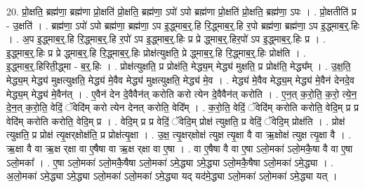 \documentclass[17pt]{extarticle}
\begin{document}
20. प्रो॒क्षति॒ ब्रह्म॑णा॒ ब्रह्म॑णा प्रो॒क्षति॑ प्रो॒क्षति॒ ब्रह्म॑णा॒ ऽपो॑ ऽपो ब्रह्म॑णा प्रो॒क्षति॑ प्रो॒क्षति॒ ब्रह्म॑णा॒ ऽपः । . प्रो॒क्षतीति॑ प्र - उ॒क्षति॑ । . ब्रह्म॑णा॒ ऽपो॑ ऽपो ब्रह्म॑णा॒ ब्रह्म॑णा॒ ऽप इ॒द्ध्माब॒र्॒.हि रि॒द्ध्माब॒र्॒.हि र॒पो ब्रह्म॑णा॒ ब्रह्म॑णा॒ ऽप इ॒द्ध्माब॒र्॒.हिः । . अ॒प इ॒द्ध्माब॒र्॒.हि रि॒द्ध्माब॒र्॒.हि र॒पो॑ ऽप इ॒द्ध्माब॒र्॒.हिः प्र प्रे द्ध्माब॒र्॒.हिर॒पो॑ ऽप इ॒द्ध्माब॒र्॒.हिः प्र । . इ॒द्ध्माब॒र्॒.हिः प्र प्रे द्ध्माब॒र्॒.हि रि॒द्ध्माब॒र्॒.हिः प्रोक्ष॑त्युक्षति॒ प्रे द्ध्माब॒र्॒.हि रि॒द्ध्माब॒र्॒.हिः प्रोक्ष॑ति । . इ॒द्ध्माब॒र्॒.हिरिती॒द्ध्मा - ब॒र्॒.हिः । . प्रोक्ष॑त्युक्षति॒ प्र प्रोक्ष॑ति॒ मेद्ध्य॒म् मेद्ध्य॑ मुक्षति॒ प्र प्रोक्ष॑ति॒ मेद्ध्य᳚म् । . उ॒क्ष॒ति॒ मेद्ध्य॒म् मेद्ध्य॑ मुक्षत्युक्षति॒ मेद्ध्य॑ मे॒वैव मेद्ध्य॑ मुक्षत्युक्षति॒ मेद्ध्य॑ मे॒व । . मेद्ध्य॑ मे॒वैव मेद्ध्य॒म् मेद्ध्य॑ मे॒वैन॑ देनदे॒व मेद्ध्य॒म् मेद्ध्य॑ मे॒वैन॑त् । . ए॒वैन॑ देन दे॒वैवैन॑त् करोति करो त्येन दे॒वैवैन॑त् करोति । . ए॒न॒त् क॒रो॒ति॒ क॒रो॒ त्ये॒न॒ दे॒न॒त् क॒रो॒ति॒ वेदिं॒ ॅवेदि॑म् करो त्येन देनत् करोति॒ वेदि᳚म् । . क॒रो॒ति॒ वेदिं॒ ॅवेदि॑म् करोति करोति॒ वेदि॒म् प्र प्र वेदि॑म् करोति करोति॒ वेदि॒म् प्र । . वेदि॒म् प्र प्र वेदिं॒ ॅवेदि॒म् प्रोक्ष॑ त्युक्षति॒ प्र वेदिं॒ ॅवेदि॒म् प्रोक्ष॑ति । . प्रोक्ष॑ त्युक्षति॒ प्र प्रोक्ष॑ त्यृ॒क्षर्‌क्षोक्ष॑ति॒ प्र प्रोक्ष॑त्यृ॒क्षा । . उ॒क्ष॒ त्यृ॒क्षर्‌क्षोक्ष॑ त्युक्ष त्यृ॒क्षा वै वा ऋ॒क्षोक्ष॑ त्युक्ष त्यृ॒क्षा वै । . ऋ॒क्षा वै वा ऋ॒क्ष र्‌क्षा वा ए॒षैषा वा ऋ॒क्ष र्‌क्षा वा ए॒षा । . वा ए॒षैषा वै वा ए॒षा ऽलो॒मका॑ ऽलो॒मकै॒षा वै वा ए॒षा ऽलो॒मका᳚ । . ए॒षा ऽलो॒मका॑ ऽलो॒मकै॒षैषा ऽलो॒मका॑ ऽमे॒द्ध्या ऽमे॒द्ध्या ऽलो॒मकै॒षैषा ऽलो॒मका॑ ऽमे॒द्ध्या । . अ॒लो॒मका॑ ऽमे॒द्ध्या ऽमे॒द्ध्या ऽलो॒मका॑ ऽलो॒मका॑ ऽमे॒द्ध्या यद् यद॑मे॒द्ध्या ऽलो॒मका॑ ऽलो॒मका॑ ऽमे॒द्ध्या यत् । \newline
\end{document}
